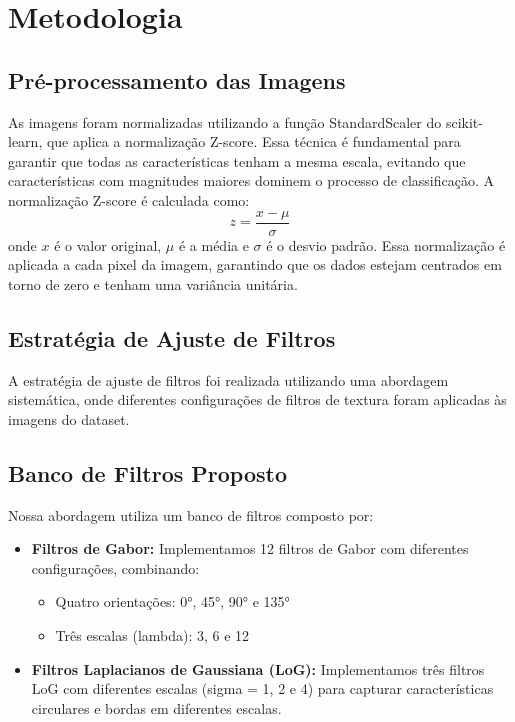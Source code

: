 \documentclass[sigconf,nonacm]{acmart}
\begin{document}
\section{Metodologia}

\subsection{Pré-processamento das Imagens}

As imagens foram normalizadas utilizando a função StandardScaler do scikit-learn, que aplica a normalização Z-score. Essa técnica é fundamental para garantir que todas as características tenham a mesma escala, evitando que características com magnitudes maiores dominem o processo de classificação.
A normalização Z-score é calculada como:
\[
z = \frac{x - \mu}{\sigma}
\]
onde \(x\) é o valor original, \(\mu\) é a média e \(\sigma\) é o desvio padrão. Essa normalização é aplicada a cada pixel da imagem, garantindo que os dados estejam centrados em torno de zero e tenham uma variância unitária.

\subsection{Estratégia de Ajuste de Filtros}

A estratégia de ajuste de filtros foi realizada utilizando uma abordagem sistemática, onde diferentes configurações de filtros de textura foram aplicadas às imagens do dataset. 

\subsection{Banco de Filtros Proposto}

Nossa abordagem utiliza um banco de filtros composto por:

\begin{itemize}
  \item \textbf{Filtros de Gabor:} Implementamos 12 filtros de Gabor com diferentes configurações, combinando:
  \begin{itemize}
    \item Quatro orientações: 0°, 45°, 90° e 135°
    \item Três escalas (lambda): 3, 6 e 12
  \end{itemize}
  \item \textbf{Filtros Laplacianos de Gaussiana (LoG):} Implementamos três filtros LoG com diferentes escalas (sigma = 1, 2 e 4) para capturar características circulares e bordas em diferentes escalas.
\end{itemize}
\end{document}
